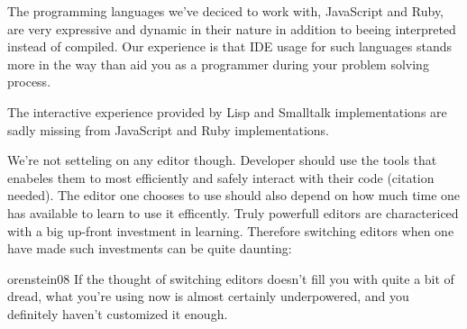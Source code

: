 The programming languages we've deciced to work with, JavaScript and Ruby, are
very expressive and dynamic in their nature in addition to beeing interpreted
instead of compiled. Our experience is that IDE usage for such languages
stands more in the way than aid you as a programmer during your problem
solving process.


The interactive experience provided by Lisp and Smalltalk implementations are
sadly missing from JavaScript and Ruby implementations.

We're not setteling on any editor though. Developer should use the tools
that enabeles them to most efficiently and safely interact with their code
(citation needed). The editor one chooses to use should also depend on how
much time one has available to learn to use it efficently. Truly powerfull
editors are charactericed with a big up-front investment in learning.
Therefore switching editors when one have made such investments can be quite
daunting:

\begin{citequote}{orenstein08}
  If the thought of switching editors doesn't fill you with quite a bit of
  dread, what you're using now is almost certainly underpowered, and you
  definitely haven't customized it enough.
\end{citequote}


